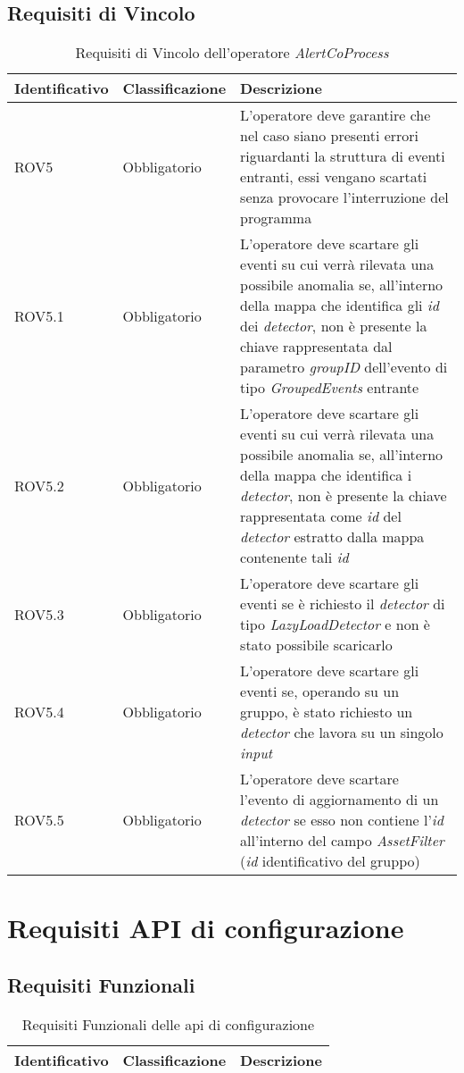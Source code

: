 \subsection{Requisiti di Vincolo}
{
\centering
\begin{longtable}{L{3cm} L{3cm} L{7.5cm}}
\caption{Requisiti di Vincolo dell'operatore \textit{AlertCoProcess}}\\
\textbf{Identificativo} &
\textbf{Classificazione}&
\textbf{Descrizione}\\
\endhead
\hline
ROV5 & Obbligatorio & L'operatore deve garantire che nel caso siano presenti errori riguardanti la struttura di eventi entranti, essi vengano scartati senza provocare l'interruzione del programma\\
\hline
ROV5.1 & Obbligatorio & L'operatore deve scartare gli eventi su cui verrà rilevata una possibile anomalia se, all'interno della mappa che identifica gli \textit{id} dei \textit{detector}, non è presente la chiave rappresentata dal parametro \textit{groupID} dell'evento di tipo \textit{GroupedEvents} entrante\\
\hline
ROV5.2 & Obbligatorio & L'operatore deve scartare gli eventi su cui verrà rilevata una possibile anomalia se, all'interno della mappa che identifica i \textit{detector}, non è presente la chiave rappresentata come \textit{id} del \textit{detector} estratto dalla mappa contenente tali \textit{id}\\
\hline
ROV5.3 & Obbligatorio & L'operatore deve scartare gli eventi se è richiesto il \textit{detector} di tipo \textit{LazyLoadDetector} e non è stato possibile scaricarlo\\
\hline
ROV5.4 & Obbligatorio & L'operatore deve scartare gli eventi se, operando su un gruppo, è stato richiesto un \textit{detector} che lavora su un singolo \textit{input}\\
\hline
ROV5.5 & Obbligatorio & L'operatore deve scartare l'evento di aggiornamento di un \textit{detector} se esso non contiene l'\textit{id} all'interno del campo \textit{AssetFilter} (\textit{id} identificativo del gruppo)\\
\hline
\end{longtable}
}

\section{Requisiti API di configurazione}
\subsection{Requisiti Funzionali}
{
\centering
\begin{longtable}{L{3cm} L{3cm} L{7.5cm}}
\caption{Requisiti Funzionali delle \gls{api} di configurazione}\\
\textbf{Identificativo} &
\textbf{Classificazione}&
\textbf{Descrizione}\\
\endhead
\hline
\hline
\end{longtable}
}

